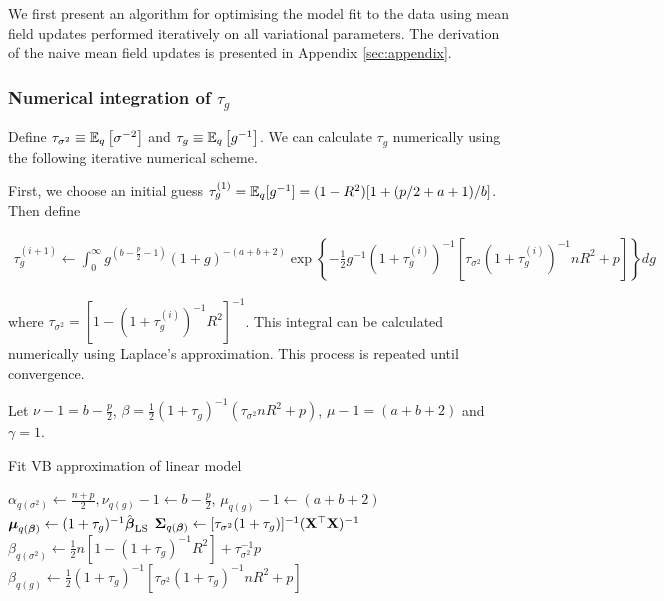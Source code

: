 \documentclass{amsart}[12pt]
\begin{document}
We first present an algorithm for optimising the model fit to the data using mean field updates performed
iteratively on all variational parameters. The derivation of the naive mean field updates is presented in
Appendix \ref{sec:appendix}.

\subsubsection{Numerical integration of $\tau_g$}
\label{sec:num_int}

Define $\tau_{\sigma^2} \equiv \mathbb{E}_q \left[ \sigma^{-2} \right]$ and $\tau_g \equiv \mathbb{E}_q \left[ g^{-1}
\right]$. We can calculate $\tau_g$ numerically using the following iterative numerical scheme.

First, we choose an initial guess $\tau_g^{(1)} = \mathbb{E}_q [g^{-1}] = (1 - R^2) [1 + (p / 2 + a + 1)/b]$. Then
define

\begin{align*}
	\tau_g^{(i+1)} \leftarrow \int_0^\infty g^{\left(b - \frac{p}{2} - 1\right)}                                   
	(1 + g)^{- (a + b + 2)}                                                                                        
	\exp \left \{- \frac{1}{2} g^{-1}  (1 + \tau_g^{(i)})^{-1} [\tau_{\sigma^2} (1 + \tau_g^{(i)})^{-1} n R^2 + p] 
	\right \} dg                                                                                                   
\end{align*}

\noindent where $\tau_{\sigma^2} = [1 - (1 + \tau_g^{(i)})^{-1} R^2]^{-1}$. This integral can be calculated
numerically using Laplace's approximation. This process is repeated until convergence.

Let $\nu - 1 = b - \frac{p}{2}$, 
$\beta = \frac{1}{2} (1 + \tau_g)^{-1} (\tau_{\sigma^2} n R^2 + p)$, 
$\mu - 1 = (a + b + 2)$ and $\gamma = 1$. 

\begin{algorithm}
	\caption{Fit VB approximation of linear model}
	\label{alg:algorithm_one}
	\begin{algorithmic}
		\REQUIRE $\alpha_{q(\sigma^2)} \leftarrow \frac{n + p}{2}, \nu_{q(g)} - 1 \leftarrow b - \frac{p}{2}$, $\mu_{q(g)} - 1 \leftarrow (a + b + 2)$
		\STATE ${\boldsymbol \mu}_{q({\boldsymbol \beta})} \leftarrow (1 + \tau_g)^{-1} \hat{{\boldsymbol \beta}}_{\text{LS}}$
		\STATE ${\boldsymbol \Sigma}_{q({\boldsymbol \beta})} \leftarrow [\tau_{\sigma^2} (1 + \tau_g)]^{-1} ({\bf X}^\top {\bf X})^{-1}$
		\STATE $\beta_{q(\sigma^2)} \leftarrow  \frac{1}{2} {n[1 - (1 + \tau_g)^{-1} R^2] + \tau_{\sigma^2}^{-1} p}$
		\STATE $\beta_{q(g)} \leftarrow \frac{1}{2} (1 + \tau_g)^{-1} [\tau_{\sigma^2} (1 + \tau_g)^{-1} n R^2 + p]$
		\ENDWHILE
	\end{algorithmic}
\end{algorithm}
\end{document}
